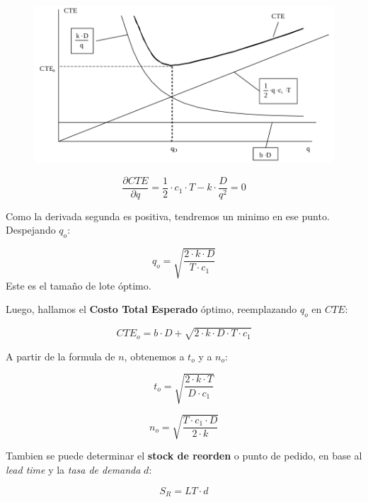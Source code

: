 \documentclass{article}
\begin{document}
\begin{figure}[h!]
    \includegraphics[width=\linewidth]{imagenes/stock-q-optimo.png}
\end{figure}

\[
    \frac{\partial CTE}{ \partial q} = \frac{1}{2} \cdot c_1 \cdot T - k \cdot \frac{D}{q^2} = 0
\]

Como la derivada segunda es positiva, tendremos un minimo en ese punto. Despejando \(q_o\):

\begin{equation}
    q_o = \sqrt{\frac{2 \cdot k \cdot D}{T \cdot c_1}}
\end{equation}
Este es el tamaño de lote óptimo.

Luego, hallamos el \textbf{Costo Total Esperado} óptimo, reemplazando \(q_o\) en \(CTE\):

\begin{equation}
    CTE_o = b \cdot D + \sqrt{2 \cdot k \cdot D \cdot T \cdot c_1}
\end{equation}

A partir de la formula de \(n\), obtenemos a \(t_o\) y a \(n_o\):

\begin{equation}
    t_o = \sqrt{\frac{2 \cdot k \cdot T}{D \cdot c_1}}
\end{equation}

\begin{equation}
    n_o = \sqrt{\frac{T \cdot c_1 \cdot D}{2 \cdot k}}
\end{equation}

Tambien se puede determinar el \textbf{stock de reorden} o punto de pedido, en base al \textit{lead time} y la \textit{tasa de demanda} \(d\):

\begin{equation}
    S_R = LT \cdot d
\end{equation}
\end{document}

